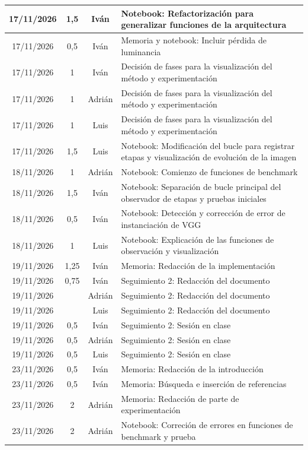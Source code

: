 \documentclass[a4paper]{article}
\begin{document}
\begin{longtable}{|c|c|c|>{\centering\arraybackslash}p{}|}
17/11/2026 & 1,5 & Iván & Notebook: Refactorización para generalizar funciones de la arquitectura\\\hline
17/11/2026 & 0,5 & Iván & Memoria y notebook: Incluir pérdida de luminancia\\\hline
17/11/2026 & 1 & Iván & Decisión de fases para la visualización del método y experimentación\\\hline
17/11/2026 & 1 & Adrián & Decisión de fases para la visualización del método y experimentación\\\hline
17/11/2026 & 1 & Luis & Decisión de fases para la visualización del método y experimentación\\\hline
17/11/2026 & 1,5 & Luis & Notebook: Modificación del bucle para registrar etapas y visualización de evolución de la imagen\\\hline
18/11/2026 & 1 & Adrián & Notebook: Comienzo de funciones de benchmark\\\hline
18/11/2026 & 1,5 & Iván & Notebook: Separación de bucle principal del observador de etapas y pruebas iniciales\\\hline
18/11/2026 & 0,5 & Iván & Notebook: Detección y corrección de error de instanciación de VGG\\\hline
18/11/2026 & 1 & Luis & Notebook: Explicación de las funciones de observación y visualización\\\hline
19/11/2026 & 1,25 & Iván & Memoria: Redacción de la implementación\\\hline
19/11/2026 & 0,75 & Iván & Seguimiento 2: Redacción del documento\\\hline
19/11/2026 &  & Adrián & Seguimiento 2: Redacción del documento\\\hline
19/11/2026 &  & Luis & Seguimiento 2: Redacción del documento\\\hline
19/11/2026 & 0,5 & Iván & Seguimiento 2: Sesión en clase\\\hline
19/11/2026 & 0,5 & Adrián & Seguimiento 2: Sesión en clase\\\hline
19/11/2026 & 0,5 & Luis & Seguimiento 2: Sesión en clase\\\hline
23/11/2026 & 0,5 & Iván & Memoria: Redacción de la introducción\\\hline
23/11/2026 & 0,5 & Iván & Memoria: Búsqueda e inserción de referencias\\\hline
23/11/2026 & 2 & Adrián & Memoria: Redacción de parte de experimentación \\\hline
23/11/2026 & 2 & Adrián & Notebook: Correción de errores en funciones de benchmark y prueba \\\hline

\end{longtable}
\end{document}

